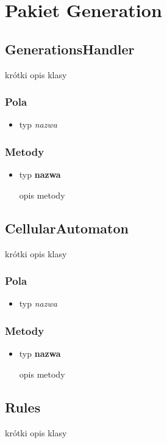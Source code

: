\documentclass[a4paper,11pt]{article}
\begin{document}
\section{Pakiet Generation}



\subsection{GenerationsHandler}
krótki opis klasy
\subsubsection{Pola}
\begin{itemize}
\item typ  \textit{nazwa}
\end{itemize}
\subsubsection{Metody}
\begin{itemize}
\item typ  \textbf{nazwa}

opis metody
\end{itemize}






\subsection{CellularAutomaton}
krótki opis klasy
\subsubsection{Pola}
\begin{itemize}
\item typ  \textit{nazwa}
\end{itemize}
\subsubsection{Metody}
\begin{itemize}
\item typ  \textbf{nazwa}

opis metody
\end{itemize}




\subsection{Rules}
krótki opis klasy
\end{document}
